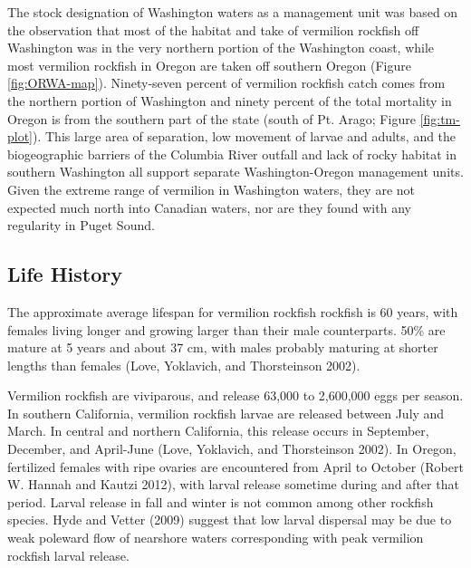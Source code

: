 \documentclass[11pt,
  english,
  a4paper,
]{article}
\begin{document}
The stock designation of Washington waters as a management unit was based on the observation that most of the habitat and take of vermilion rockfish off Washington was in the very northern portion of the Washington coast, while most vermilion rockfish in Oregon are taken off southern Oregon (Figure \ref{fig:ORWA-map}). Ninety-seven percent of vermilion rockfish catch comes from the northern portion of Washington and ninety percent of the total mortality in Oregon is from the southern part of the state (south of Pt. Arago; Figure \ref{fig:tm-plot}). This large area of separation, low movement of larvae and adults, and the biogeographic barriers of the Columbia River outfall and lack of rocky habitat in southern Washington all support separate Washington-Oregon management units. Given the extreme range of vermilion in Washington waters, they are not expected much north into Canadian waters, nor are they found with any regularity in Puget Sound.

\leavevmode\tagmcend\tagstructend\par


\hypertarget{life-history}{%
\subsection{Life History}\label{life-history}}

\leavevmode\tagmcend\tagstructend


The approximate average lifespan for vermilion rockfish rockfish is 60 years, with females living longer and growing larger than their male counterparts. 50\% are mature at 5 years and about 37 cm, with males probably maturing at shorter lengths than females {(Love, Yoklavich, and Thorsteinson 2002)\leavevmode\tagmcend\tagstructend}.

\leavevmode\tagmcend\tagstructend\par


Vermilion rockfish are viviparous, and release 63,000 to 2,600,000 eggs per season. In southern California, vermilion rockfish larvae are released between July and March. In central and northern California, this release occurs in September, December, and April-June {(Love, Yoklavich, and Thorsteinson 2002)\leavevmode\tagmcend\tagstructend}. In Oregon, fertilized females with ripe ovaries are encountered from April to October {(Robert W. Hannah and Kautzi 2012)\leavevmode\tagmcend\tagstructend}, with larval release sometime during and after that period. Larval release in fall and winter is not common among other rockfish species. Hyde and Vetter {(2009)\leavevmode\tagmcend\tagstructend} suggest that low larval dispersal may be due to weak poleward flow of nearshore waters corresponding with peak vermilion rockfish larval release.
\end{document}
